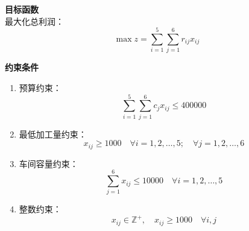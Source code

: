 \textbf{目标函数}\\
最大化总利润：
\[
\max z = \sum_{i=1}^5 \sum_{j=1}^6 r_{ij} x_{ij}
\]

\textbf{约束条件}
\begin{enumerate}
    \item 预算约束：
    \[
    \sum_{i=1}^5 \sum_{j=1}^6 c_j x_{ij} \leq 400000
    \]
    \item 最低加工量约束：
    \[
    x_{ij} \geq 1000 \quad \forall i = 1, 2, \ldots, 5; \quad \forall j = 1, 2, \ldots, 6
    \]
    \item 车间容量约束：
    \[
    \sum_{j=1}^6 x_{ij} \leq 10000 \quad \forall i = 1, 2, \ldots, 5
    \]
    \item 整数约束：
    \[
    x_{ij} \in \mathbb{Z}^+, \quad x_{ij} \geq 1000 \quad \forall i, j
    \]
\end{enumerate}

